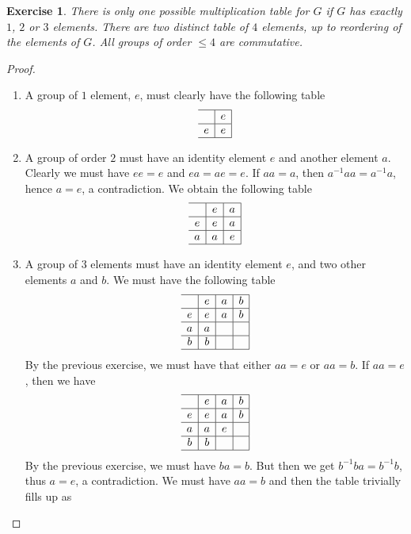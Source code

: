 \documentclass[a4paper, 11pt]{book}
\theoremstyle{plain}
\newtheorem{exercise}[theorem]{Exercise}
\theoremstyle{plain}
\begin{document}
\begin{exercise}
There is only one possible multiplication table for $G$ if $G$ has exactly $1$, $2$ or $3$ elements. There are two distinct table of $4$ elements, up to reordering of the elements of $G$. All groups of order $\leq 4$ are commutative.
\end{exercise}
\begin{proof}
\begin{enumerate}
    \item A group of $1$ element, $e$, must clearly have the following table
    $$\begin{array}{c|c|}
    \hline
    & e\\
    \hline
    e & e\\
    \hline
    \end{array}$$
    \item A group of order $2$ must have an identity element $e$ and another element $a$. Clearly we must have $ee=e$ and $ea=ae=e$. If $aa=a$, then $a^{-1}aa=a^{-1}a$, hence $a=e$, a contradiction. We obtain the following table
        $$\begin{array}{c|c|c|}
    \hline
    & e & a\\
    \hline
    e & e & a\\
    \hline
    a & a & e\\
    \hline
    \end{array}$$
    \item A group of $3$ elements must have an identity element $e$, and two other elements $a$ and $b$. We must have the following table
           $$\begin{array}{c|c|c|c|}
    \hline
    & e & a & b\\
    \hline
    e & e & a & b\\
    \hline
    a & a &   &  \\
    \hline
    b & b &   &   \\
    \hline
    \end{array}$$ 
    By the previous exercise, we must have that either $aa=e$ or $aa=b$. If $aa=e$, then we have
               $$\begin{array}{c|c|c|c|}
    \hline
    & e & a & b\\
    \hline
    e & e & a & b\\
    \hline
    a & a & e &  \\
    \hline
    b & b &   &   \\
    \hline
    \end{array}$$ 
    By the previous exercise, we must have $ba = b$. But then we get $b^{-1}ba=b^{-1}b$, thus $a=e$, a contradiction. We must have $aa=b$ and then the table trivially fills up as

\end{enumerate}
\end{proof}
\end{document}
